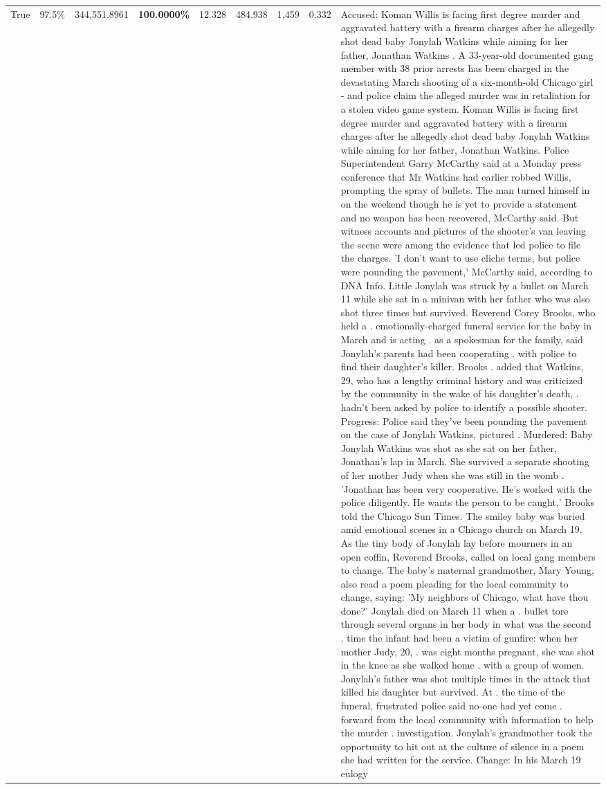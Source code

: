 \begin{table}[H]
\begin{tabular}{lllrlllll}
True & 97.5\% & 344,551.8961 & \bfseries \color{red} 100.0000\% & 12.328 & 484.938 & 1,459 & 0.332 & Accused: Koman Willis is facing first degree murder and aggravated battery with a firearm charges after he allegedly shot dead baby Jonylah Watkins while aiming for her father, Jonathan Watkins . A 33-year-old documented gang member with 38 prior arrests has been charged in the devastating March shooting of a six-month-old Chicago girl - and police claim the alleged murder was in retaliation for a stolen video game system. Koman Willis is facing first degree murder and aggravated battery with a firearm charges after he allegedly shot dead baby Jonylah Watkins while aiming for her father, Jonathan Watkins. Police Superintendent Garry McCarthy said at a Monday press conference that Mr Watkins had earlier robbed Willis, prompting the spray of bullets. The man turned himself in on the weekend though he is yet to provide a statement and no weapon has been recovered, McCarthy said. But witness accounts and pictures of the shooter's van leaving the scene were among the evidence that led police to file the charges. 'I don't want to use cliche terms, but police were pounding the pavement,' McCarthy said, according to DNA Info. Little Jonylah was struck by a bullet on March 11 while she sat in a minivan with her father who was also shot three times but survived. Reverend Corey Brooks, who held a . emotionally-charged funeral service for the baby in March and is acting . as a spokesman for the family, said Jonylah's parents had been cooperating . with police to find their daughter's killer. Brooks . added that Watkins, 29, who has a lengthy criminal history and was criticized by the community in the wake of his daughter's death, . hadn't been asked by police to identify a possible shooter. Progress: Police said they've been pounding the pavement on the case of Jonylah Watkins, pictured . Murdered: Baby Jonylah Watkins was shot as she sat on her father, Jonathan's lap in March. She survived a separate shooting of her mother Judy when she was still in the womb . 'Jonathan has been very cooperative. He's worked with the police diligently. He wants the person to be caught,' Brooks told the Chicago Sun Times. The smiley baby was buried amid emotional scenes in a Chicago church on March 19. As the tiny body of Jonylah lay before mourners in an open coffin, Reverend Brooks, called on local gang members to change. The baby's maternal grandmother, Mary Young, also read a poem pleading for the local community to change, saying: 'My neighbors of Chicago, what have thou done?' Jonylah died on March 11 when a . bullet tore through several organs in her body in what was the second . time the infant had been a victim of gunfire: when her mother Judy, 20, . was eight months pregnant, she was shot in the knee as she walked home . with a group of women. Jonylah's father was shot multiple times in the attack that killed his daughter but survived. At . the time of the funeral, frustrated police said no-one had yet come . forward from the local community with information to help the murder . investigation. Jonylah's grandmother took the opportunity to hit out at the culture of silence in a poem she had written for the service. Change: In his March 19 eulogy 
\end{tabular}
\end{table}
